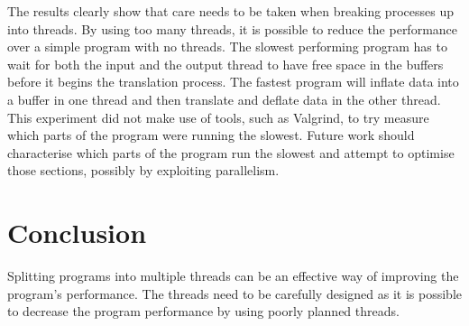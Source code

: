 \documentclass[a4paper,12pt]{article}
\begin{document}
The results clearly show that care needs to be taken when breaking processes up into threads.
By using too many threads, it is possible to reduce the performance over a simple program with no threads.
The slowest performing program has to wait for both the input and the output thread to have free space in the buffers before it begins the translation process.
The fastest program will inflate data into a buffer in one thread and then translate and deflate data in the other thread.
This experiment did not make use of tools, such as Valgrind, to try measure which parts of the program were running the slowest.
Future work should characterise which parts of the program run the slowest and attempt to optimise those sections, possibly by exploiting parallelism.

\section{Conclusion}
Splitting programs into multiple threads can be an effective way of improving the program's performance.
The threads need to be carefully designed as it is possible to decrease the program performance by using poorly planned threads.
\end{document}
